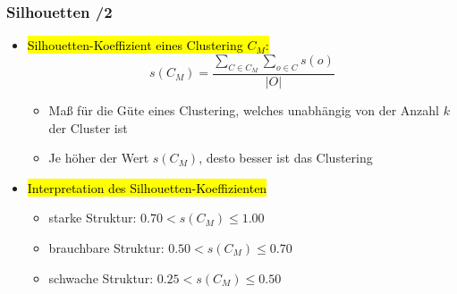 

\begin{frame}
\frametitle{Silhouetten /2}

\begin{itemize}
\item \hl{Silhouetten-Koeffizient eines Clustering $C_M$:}
$$s(C_M) = \frac{\displaystyle\sum_{C\in C_M} \displaystyle\sum_{o \in C} s(o)}{|O|}$$
\begin{itemize}
\item Maß für die Güte eines Clustering, welches unabhängig von der
  Anzahl $k$ der Cluster ist  
\item Je höher der Wert $s(C_M)$, desto besser ist das Clustering
\end{itemize}
\item\hl{Interpretation des Silhouetten-Koeffizienten}
\begin{itemize}
\item starke Struktur: $0.70 < s(C_M) \leq 1.00$ 
\item brauchbare Struktur: $0.50 < s(C_M) \leq 0.70$ 
\item schwache Struktur: $0.25 < s(C_M) \leq 0.50$ 
\end{itemize}
\end{itemize}
\end{frame}



